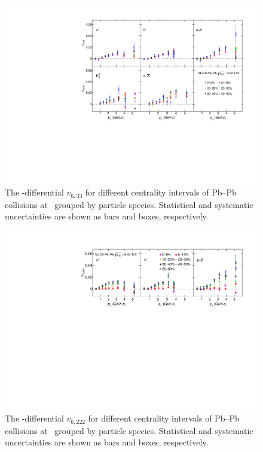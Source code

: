 \begin{figure}[!htb]
\begin{center}
\includegraphics[scale=0.82]{figures/results/All_v633_gap00_CentDep_PID2.pdf}
\end{center}
\caption{The \pT-differential $v_{6,33}$ for different centrality intervals of Pb--Pb collisions at \sNN~grouped by particle species. Statistical and systematic uncertainties are shown as bars and boxes, respectively.}
\label{v633_centralityDependence}
\end{figure}

\begin{figure}[!htb]
\begin{center}
\includegraphics[scale=0.82]{figures/results/All_v6222_gap00_CentDep_PID2.pdf}
\end{center}
\caption{The \pT-differential $v_{6,222}$ for different centrality intervals of Pb--Pb collisions at \sNN~grouped by particle species. Statistical and systematic uncertainties are shown as bars and boxes, respectively.}
\label{v6222_centralityDependence}
\end{figure}

